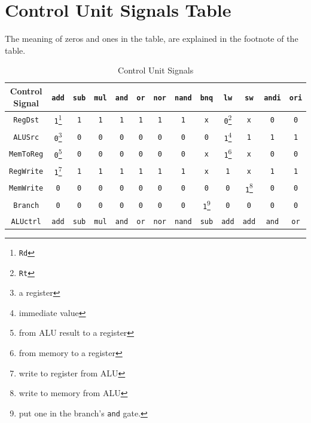 \documentclass[12pt, dvipsnames, svgnames, x11names, oneside]{book}
\begin{document}
\section{Control Unit Signals Table}

The meaning of zeros and ones in the table, are explained in the footnote of the table.

\begin{table}
\caption{Control Unit Signals}
\begin{center}
\begin{tabular}{|c|c|c|c|c|c|c|c|c|c|c|c|c|}
\hline
Control Signal &
\texttt{add} &
\texttt{sub} &
\texttt{mul} &
\texttt{and} &
\texttt{or} &
\texttt{nor} &
\texttt{nand} &
\texttt{bnq} &
\texttt{lw} &
\texttt{sw} &
\texttt{andi} &
\texttt{ori} \\
\hline
\hline
\texttt{RegDst} & 
\texttt{1}\footnote{\texttt{Rd}} &
\texttt{1} &
\texttt{1} &
\texttt{1} &
\texttt{1} &
\texttt{1} &
\texttt{1} &
\texttt{x} &
\texttt{0}\footnote{\texttt{Rt}} &
\texttt{x} &
\texttt{0} &
\texttt{0} \\
\hline
\texttt{ALUSrc} &
\texttt{0}\footnote{a register} &
\texttt{0} &
\texttt{0} &
\texttt{0} &
\texttt{0} &
\texttt{0} &
\texttt{0} &
\texttt{0} &
\texttt{1}\footnote{immediate value} &
\texttt{1} &
\texttt{1} &
\texttt{1} \\ 
\hline
\texttt{MemToReg} &
\texttt{0}\footnote{from ALU result to a register} &
\texttt{0} &
\texttt{0} &
\texttt{0} &
\texttt{0} &
\texttt{0} &
\texttt{0} &
\texttt{x} &
\texttt{1}\footnote{from memory to a register} &
\texttt{x} &
\texttt{0} &
\texttt{0} \\ 
\hline
\texttt{RegWrite} &
\texttt{1}\footnote{write to register from ALU} &
\texttt{1} &
\texttt{1} &
\texttt{1} &
\texttt{1} &
\texttt{1} &
\texttt{1} &
\texttt{x} &
\texttt{1} &
\texttt{x} &
\texttt{1} &
\texttt{1} \\ 
\hline
\texttt{MemWrite} &
\texttt{0} &
\texttt{0} &
\texttt{0} &
\texttt{0} &
\texttt{0} &
\texttt{0} &
\texttt{0} &
\texttt{0} &
\texttt{0} &
\texttt{1}\footnote{write to memory from ALU} &
\texttt{0} &
\texttt{0} \\ 
\hline
\texttt{Branch} &
\texttt{0} &
\texttt{0} &
\texttt{0} &
\texttt{0} &
\texttt{0} &
\texttt{0} &
\texttt{0} &
\texttt{1}\footnote{put one in the branch's \texttt{and} gate.} &
\texttt{0} &
\texttt{0} &
\texttt{0} &
\texttt{0} \\ 
\hline
\texttt{ALUctrl} &
\texttt{add} &
\texttt{sub} &
\texttt{mul} &
\texttt{and} &
\texttt{or} &
\texttt{nor} &
\texttt{nand} &
\texttt{sub} &
\texttt{add} &
\texttt{add} &
\texttt{and} &
\texttt{or} \\ 
\hline
\end{tabular}
\end{center}
\end{table}\label{sec:table:cu}
\end{document}
